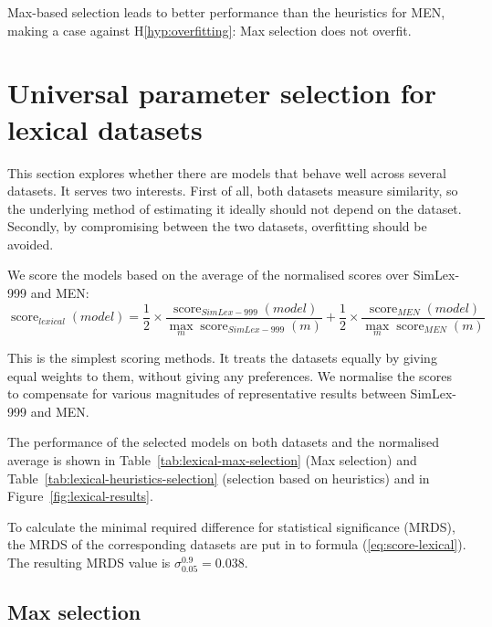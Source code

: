 Max-based selection leads to better performance than the heuristics for MEN, making a case against H\ref{hyp:overfitting}: Max selection does not overfit.

\section{Universal parameter selection for lexical datasets}
\label{sec:universal-lexical-param-selection}

This section explores whether there are models that behave well across several datasets. It serves two interests. First of all, both datasets measure similarity, so the underlying method of estimating it ideally should not depend on the dataset. Secondly, by compromising between the two datasets, overfitting should be avoided.

We score the models based on the average of the normalised scores over SimLex-999 and MEN:
\begin{equation}
\label{eq:score-lexical}
\operatorname{score}_\mathit{lexical}(\mathit{model}) =%
\frac{1}{2}\times%
\frac{\operatorname{score}_\mathit{SimLex-999}(\mathit{model})}%
{\max_m\operatorname{score}_\mathit{SimLex-999}(m)}%
+%
\frac{1}{2}\times%
\frac{\operatorname{score}_\mathit{MEN}(\mathit{model})}%
{\max_m\operatorname{score}_\mathit{MEN}(m)}%
\end{equation}

This is the simplest scoring methods. It treats the datasets equally by giving equal weights to them, without giving any preferences. We normalise the scores to compensate for various magnitudes of representative results between SimLex-999 and MEN.

The performance of the selected models on both datasets and the normalised average is shown in Table~\ref{tab:lexical-max-selection} (Max selection) and Table~\ref{tab:lexical-heuristics-selection} (selection based on heuristics) and in Figure~\ref{fig:lexical-results}.



To calculate the minimal required difference for statistical significance
(MRDS), the MRDS of the corresponding datasets are put in to formula
(\ref{eq:score-lexical}). The resulting MRDS value is $\sigma^{0.9}_{0.05} = 0.038$.

\subsection{Max selection}
\label{sec:max-selection}


